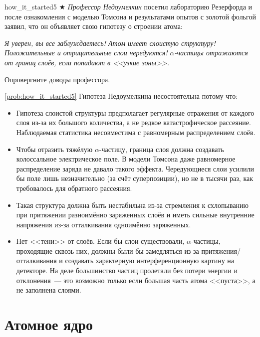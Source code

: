 \begin{problem}{}{how_it_started5}
    $\bigstar$ \textit{Профессор Недоумелкин} посетил лабораторию Резерфорда и после ознакомления с моделью Томсона и результатами опытов с золотой фольгой заявил, что он объявляет свою гипотезу о строении атома:

    \medskip

    \emph{Я уверен, вы все заблуждаетесь! Атом имеет слоистую структуру! Положительные и отрицательные слои чередуются! $\alpha$-частицы отражаются от границ слоёв, если попадают в <<узкие зоны>>.}

    \medskip

    Опровергните доводы профессора.

    \begin{sol}{\ref{prob:how_it_started5}}
        Гипотеза Недоумелкина несостоятельна потому что:
        \begin{itemize}
            \item Гипотеза слоистой структуры предполагает регулярные отражения от каждого слоя из-за их большого количества, а не редкое катастрофическое рассеяние. Наблюдаемая статистика несовместима с равномерным распределением слоёв.
            \item Чтобы отразить тяжёлую $\alpha$-частицу, граница слоя должна создавать колоссальное электрическое поле. В модели Томсона даже равномерное распределение заряда не давало такого эффекта. Чередующиеся слои усилили бы поле лишь незначительно (за счёт суперпозиции), но не в тысячи раз, как требовалось для обратного рассеяния.
            \item Такая структура должна быть нестабильна из-за стремления к схлопыванию при притяжении разноимённо заряженных слоёв и иметь сильные внутренние напряжения из-за отталкивания одноимённо заряженных.
            \item Нет <<тени>> от слоёв. Если бы слои существовали, $\alpha$-частицы, проходящие сквозь них, должны были бы замедляться из-за притяжения/отталкивания и создавать характерную интерференционную картину на детекторе. На деле большинство частиц пролетали без потери энергии и отклонения~--- это возможно только если большая часть атома <<пуста>>, а не заполнена слоями.
        \end{itemize}
    \end{sol}
\end{problem}

\clearpage

\section{Атомное ядро}


